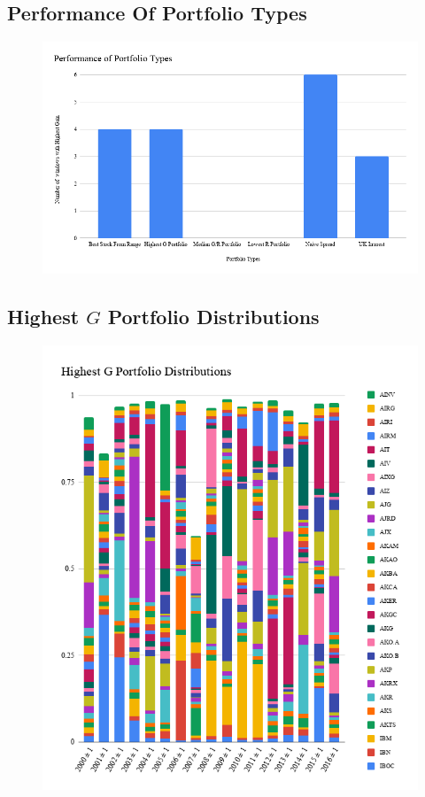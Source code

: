 \documentclass[11pt]{article}
\begin{document}
\subsection{Performance Of Portfolio Types}\label{apd:PerformanceOfPortfolioTypes}
    \begin{figure}[H]
        \includegraphics[width=\textwidth]{PerformanceOfPortfolioTypes}
    \end{figure}

\subsection{Highest \(G\) Portfolio Distributions}\label{apd:HighestGPortfolioDistributions}
    \begin{figure}[H]
        \includegraphics[width=\textwidth]{HighestGPortfolioDistributions}
    \end{figure}
\end{document}
